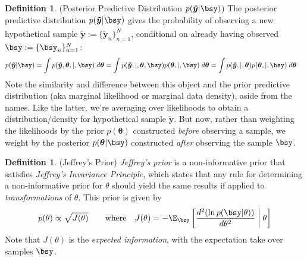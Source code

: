 \documentclass[12pt]{article}
\theoremstyle{plain}
\theoremstyle{definition}
\newtheorem{defn}[thm]{Definition}
\theoremstyle{remark}
\newcommand{\bstheta}{\boldsymbol{\theta}}
\newcommand{\bstildey}{\boldsymbol{\tilde{y}}}
\newcommand{\nN}{_{n=1}^N}
\begin{document}
\begin{defn}(Posterior Predictive Distribution $p(\bstildey|\bsy)$)
The posterior predictive distribution $p(\bstildey|\bsy)$ gives the
probability of observing a new hypothetical sample
$\bstildey:=\{\bstildey_n\}_{n=1}^{\tilde{N}}$, conditional on already
having observed $\bsy:=\{\bsy_n\}\nN$:
\begin{align}
  p(\bstildey|\bsy)
  &= \int p(\bstildey, \bstheta,|,\bsy) \;d\bstheta
  = \int p(\bstildey,|,\bstheta,\bsy) p(\bstheta,|,\bsy) \; d\bstheta
  = \int p(\bstildey,|,\bstheta) p(\bstheta,|,\bsy) \; d\bstheta
	\label{pospred}
\end{align}
Note the similarity and difference between this object and the prior
predictive distribution (aka marginal likelihood or marginal data
density), aside from the names. Like the latter, we're averaging over
likelihoods to obtain a distribution/density for hypothetical sample
$\bstildey$.
But now, rather than weighting the likelihoods by the prior
$p(\bstheta)$ constructed \emph{before} observing a sample,
we weight by the posterior $p(\bstheta|\bsy)$ constructed \emph{after}
observing the sample $\bsy$.
\end{defn}

\begin{defn}(Jeffrey's Prior)
\emph{Jeffrey's prior} is a non-informative prior that satisfies
\emph{Jeffrey's Invariance Principle}, which states that any rule for
determining a non-informative prior for $\theta$ should yield the same
results if applied to \emph{transformations} of $\theta$.
This prior is given by
\begin{align*}
  p(\theta)
  \propto \sqrt{J(\theta)}
  \qquad \text{where}\quad
  J(\theta) =
  -\E_{\bsy}\left[
    \frac{d^2(\ln p(\bsy | \theta))}{ d\theta^2}
    \; \bigg\lvert \;
    \theta
  \right]
\end{align*}
Note that $J(\theta)$ is the \emph{expected information}, with the
expectation take over samples $\bsy$.
\end{defn}


\end{document}
